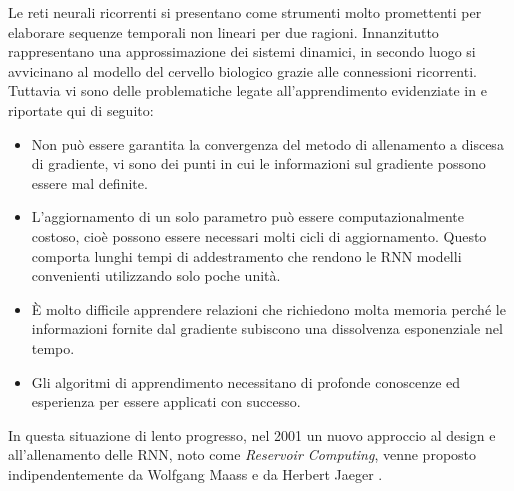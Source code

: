Le reti neurali ricorrenti si presentano come strumenti molto promettenti per elaborare sequenze temporali non lineari per due ragioni. Innanzitutto rappresentano una approssimazione dei sistemi dinamici, in secondo luogo si avvicinano al modello del cervello biologico grazie alle connessioni ricorrenti.\\
Tuttavia vi sono delle problematiche legate all'apprendimento evidenziate in \cite{RCapproch:paper} e riportate qui di seguito:
\begin{itemize}
	\item Non può essere garantita la convergenza del metodo di allenamento a discesa di gradiente, vi sono dei punti in cui le informazioni sul gradiente possono essere mal definite.
	\item L'aggiornamento di un solo parametro può essere computazionalmente costoso,
	cioè possono essere necessari molti cicli di aggiornamento. Questo comporta lunghi tempi di addestramento che rendono le RNN modelli convenienti utilizzando solo poche unità.
	\item È molto difficile apprendere relazioni che richiedono molta memoria perché le informazioni fornite dal gradiente subiscono una dissolvenza esponenziale nel tempo.
	\item  Gli algoritmi di apprendimento necessitano di  profonde conoscenze ed esperienza per essere applicati con successo.
\end{itemize}
In questa situazione di lento progresso, nel 2001 un nuovo approccio al design e all'allenamento delle RNN, noto come \textit{Reservoir Computing}, venne proposto indipendentemente da Wolfgang Maass \cite{w} e da Herbert Jaeger \cite{h}.





